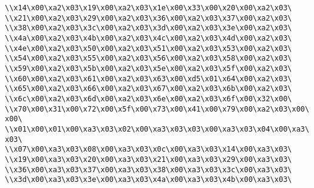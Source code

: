 \verb|\\x14\x00\xa2\x03\x19\x00\xa2\x03\x1e\x00\x33\x00\x20\x00\xa2\x03\|\newline
\verb|\\x21\x00\xa2\x03\x29\x00\xa2\x03\x36\x00\xa2\x03\x37\x00\xa2\x03\|\newline
\verb|\\x38\x00\xa2\x03\x3c\x00\xa2\x03\x3d\x00\xa2\x03\x3e\x00\xa2\x03\|\newline
\verb|\\x4a\x00\xa2\x03\x4b\x00\xa2\x03\x4c\x00\xa2\x03\x4d\x00\xa2\x03\|\newline
\verb|\\x4e\x00\xa2\x03\x50\x00\xa2\x03\x51\x00\xa2\x03\x53\x00\xa2\x03\|\newline
\verb|\\x54\x00\xa2\x03\x55\x00\xa2\x03\x56\x00\xa2\x03\x58\x00\xa2\x03\|\newline
\verb|\\x59\x00\xa2\x03\x5b\x00\xa2\x03\x5e\x00\xa2\x03\x5f\x00\xa2\x03\|\newline
\verb|\\x60\x00\xa2\x03\x61\x00\xa2\x03\x63\x00\xd5\x01\x64\x00\xa2\x03\|\newline
\verb|\\x65\x00\xa2\x03\x66\x00\xa2\x03\x67\x00\xa2\x03\x6b\x00\xa2\x03\|\newline
\verb|\\x6c\x00\xa2\x03\x6d\x00\xa2\x03\x6e\x00\xa2\x03\x6f\x00\x32\x00\|\newline
\verb|\\x70\x00\x31\x00\x72\x00\x5f\x00\x73\x00\x41\x00\x79\x00\xa2\x03\x00\x00\|\newline
\verb|\\x01\x00\x01\x00\xa3\x03\x02\x00\xa3\x03\x03\x00\xa3\x03\x04\x00\xa3\x03\|\newline
\verb|\\x07\x00\xa3\x03\x08\x00\xa3\x03\x0c\x00\xa3\x03\x14\x00\xa3\x03\|\newline
\verb|\\x19\x00\xa3\x03\x20\x00\xa3\x03\x21\x00\xa3\x03\x29\x00\xa3\x03\|\newline
\verb|\\x36\x00\xa3\x03\x37\x00\xa3\x03\x38\x00\xa3\x03\x3c\x00\xa3\x03\|\newline
\verb|\\x3d\x00\xa3\x03\x3e\x00\xa3\x03\x4a\x00\xa3\x03\x4b\x00\xa3\x03\|\newline
